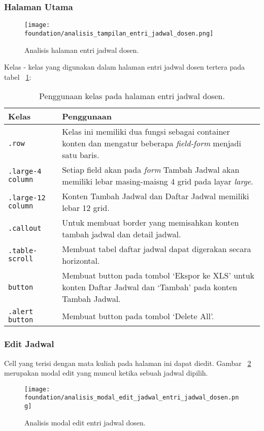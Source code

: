 \subsubsection{Halaman Utama}
\begin{figure} [H]
	\centering  
	\texttt{[image: foundation/analisis\_tampilan\_entri\_jadwal\_dosen.png]}
	\caption{Analisis halaman entri jadwal dosen.}
	\label{fig:analisisEntriJadwalDosen}
\end{figure}
Kelas - kelas yang digunakan dalam halaman entri jadwal dosen tertera pada tabel ~\ref{table:analisisEntriJadwalDosen}:
\begin{table}[H]
	\centering
	\caption{Penggunaan kelas pada halaman entri jadwal dosen.}
	\begin{tabularx}{\textwidth}{lX}
		\toprule
		Kelas     & Penggunaan \\
		\midrule
		\texttt{.row} & Kelas ini memiliki dua fungsi sebagai container konten dan mengatur beberapa \textit{field-form} menjadi satu baris. \\
		\texttt{.large-4 column} & Setiap field akan pada \textit{form} Tambah Jadwal akan memiliki lebar masing-maisng 4 grid pada layar \textit{large}.\\
		\texttt{.large-12 column} & Konten Tambah Jadwal dan Daftar Jadwal memiliki lebar 12 grid.\\
		\texttt{.callout} & Untuk membuat border yang memisahkan konten tambah jadwal dan detail jadwal.\\
		\texttt{.table-scroll} & Membuat tabel daftar jadwal dapat digerakan secara horizontal.\\
		\texttt{button} & Membuat button pada tombol `Ekspor ke XLS' untuk konten Daftar Jadwal dan `Tambah' pada konten Tambah Jadwal.\\
		\texttt{.alert button} & Membuat button pada tombol `Delete All'.\\
		\bottomrule
	\end{tabularx}%
	\label{table:analisisEntriJadwalDosen}
\end{table}

\subsubsection{Edit Jadwal}
Cell yang terisi dengan mata kuliah pada halaman ini dapat diedit. Gambar ~\ref{fig:analisisEditEntriJadwalDosen} merupakan modal edit yang muncul ketika sebuah jadwal dipilih. 
\begin{figure} [H]
	\centering  
	\texttt{[image: foundation/analisis\_modal\_edit\_jadwal\_entri\_jadwal\_dosen.png]}
	\caption{Analisis modal edit entri jadwal dosen.}
	\label{fig:analisisEditEntriJadwalDosen}
\end{figure}


